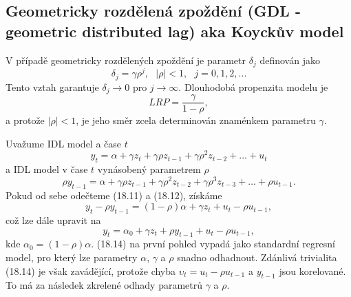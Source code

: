 \subsection{Geometricky rozdělená zpoždění (GDL - geometric distributed lag) aka Koyckův model}

V případě geometricky rozdělených zpoždění je parametr $\delta_j$ definován jako
\begin{equation}
\delta_j = \gamma \rho^j, ~~~ |\rho| < 1, ~~~ j = 0, 1, 2, ...
\end{equation}
Tento vztah garantuje $\delta_j \rightarrow 0$ pro $j \rightarrow \infty$. Dlouhodobá propenzita modelu je
\begin{equation}
LRP = \frac{\gamma}{1 - \rho},
\end{equation}
a protože $|\rho| < 1$, je jeho směr zcela determinován znaménkem parametru $\gamma$.

Uvažume IDL model a čase $t$
\begin{equation}
y_t = \alpha + \gamma z_t + \gamma \rho z_{t-1} + \gamma \rho^2 z_{t-2} + ... + u_t
\end{equation}
a IDL model v čase $t$ vynásobený parametrem $\rho$
\begin{equation}
\rho y_{t-1} = \alpha + \gamma \rho z_{t-1} + \gamma \rho^2 z_{t-2} + \gamma \rho^3 z_{t-3} + ... + \rho u_{t-1}.
\end{equation}
Pokud od sebe odečteme (18.11) a (18.12), získáme
\begin{equation}
y_t - \rho y_{t - 1} = (1 - \rho)\alpha + \gamma z_t + u_t - \rho u_{t - 1},
\end{equation}
což lze dále upravit na
\begin{equation}
y_t = \alpha_0 + \gamma z_t + \rho y_{t-1} + u_t - \rho u_{t - 1},
\end{equation}
kde $\alpha_0 = (1 - \rho) \alpha$. (18.14) na první pohled vypadá 
jako standardní regresní model, pro který lze parametry 
$\alpha$, $\gamma$ a $\rho$ snadno odhadnout. Zdánlivá trivialita (18.14) je však zavádějící, protože chyba $\upsilon_t = u_t - \rho u_{t - 1}$ a $y_{t-1}$ jsou 
korelované. To má za následek zkrelené odhady parametrů $\gamma$ a $\rho$.

